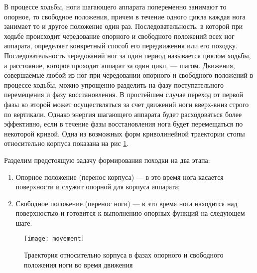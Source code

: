В процессе ходьбы, ноги шагающего аппарата попеременно занимают то опорное, то свободное положения, причем в течение одного цикла каждая нога занимает то и другое положение один раз. Последовательность, в которой при ходьбе происходит чередование опорного и свободного положений всех ног аппарата, определяет конкретный способ его передвижения или его походку. Последовательность чередований ног за один период называется циклом ходьбы, а расстояние, которое проходит аппарат за один цикл, --- шагом\cite{Nakano}.
Движения, совершаемые любой из ног при чередовании опорного и свободного положений в процессе ходьбы, можно упрощенно разделить на фазу поступательного перемещения и фазу восстановления. В простейшем случае переход от первой фазы ко второй может осуществляться за счет движений ноги вверх-вниз строго по вертикали. Однако энергия шагающего аппарата будет расходоваться более эффективно, если в течение фазы восстановления нога будет перемещаться по некоторой кривой. Одна из возможных форм криволинейной траектории стопы относительно корпуса показана на рис \ref{movement}.

Разделим предстоящую задачу формирования походки на два этапа:

\begin{enumerate} 
	\item Опорное положение (перенос корпуса) --- в это время нога касается поверхности и служит опорной для корпуса аппарата;
	\item Свободное положение (перенос ноги) --- в это время нога находится над поверхностью и готовится к выполнению опорных функций на следующем шаге.
\end{enumerate}
\newpage
\begin{figure}[h!]
	\begin{center}
		\texttt{[image: movement]}
		\caption{Траектория относительно корпуса в фазах опорного и свободного положения ноги во время движения}
		\label{movement}
	\end{center}
\end{figure}

